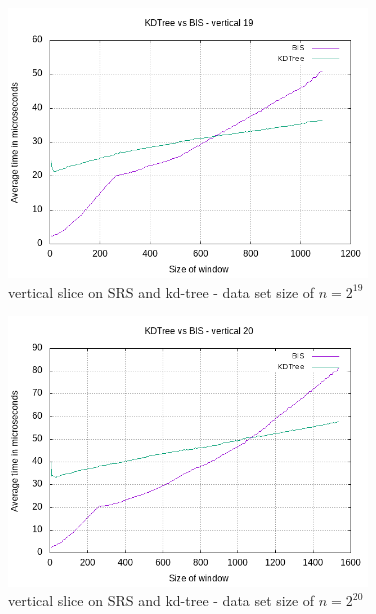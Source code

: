 \begin{figure}[h]
    \centering
    \includegraphics[width = 0.85\textwidth]{pictures/analysis/vert_19.png}
    \caption{vertical slice on SRS and kd-tree - data set size of $n=2^{19}$}\label{fig:vert_19}
\end{figure}

\begin{figure}[h]
    \centering
    \includegraphics[width = 0.85\textwidth]{pictures/analysis/vert_20.png}
    \caption{vertical slice on SRS and kd-tree - data set size of $n=2^{20}$}\label{fig:vert_20}
\end{figure}

